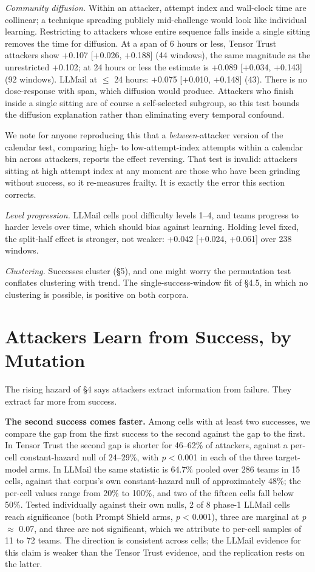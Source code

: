 \documentclass[conference]{IEEEtran}
\begin{document}
\textit{Community diffusion.} Within an attacker, attempt index and wall-clock time are collinear; a technique spreading publicly mid-challenge would look like individual learning. Restricting to attackers whose entire sequence falls inside a single sitting removes the time for diffusion. At a span of 6 hours or less, Tensor Trust attackers show +0.107 [+0.026, +0.188] (44 windows), the same magnitude as the unrestricted +0.102; at 24 hours or less the estimate is +0.089 [+0.034, +0.143] (92 windows). LLMail at $\le$ 24 hours: +0.075 [+0.010, +0.148] (43). There is no dose-response with span, which diffusion would produce. Attackers who finish inside a single sitting are of course a self-selected subgroup, so this test bounds the diffusion explanation rather than eliminating every temporal confound.

We note for anyone reproducing this that a \textit{between}-attacker version of the calendar test, comparing high- to low-attempt-index attempts within a calendar bin across attackers, reports the effect reversing. That test is invalid: attackers sitting at high attempt index at any moment are those who have been grinding without success, so it re-measures frailty. It is exactly the error this section corrects.

\textit{Level progression.} LLMail cells pool difficulty levels 1--4, and teams progress to harder levels over time, which should bias against learning. Holding level fixed, the split-half effect is stronger, not weaker: +0.042 [+0.024, +0.061] over 238 windows.

\textit{Clustering.} Successes cluster (\S5), and one might worry the permutation test conflates clustering with trend. The single-success-window fit of \S4.5, in which no clustering is possible, is positive on both corpora.


\section{Attackers Learn from Success, by Mutation}

The rising hazard of \S4 says attackers extract information from failure. They extract far more from success.

\textbf{The second success comes faster.} Among cells with at least two successes, we compare the gap from the first success to the second against the gap to the first. In Tensor Trust the second gap is shorter for 46--62\% of attackers, against a per-cell constant-hazard null of 24--29\%, with \textit{p} \textless{} 0.001 in each of the three target-model arms. In LLMail the same statistic is 64.7\% pooled over 286 teams in 15 cells, against that corpus's own constant-hazard null of approximately 48\%; the per-cell values range from 20\% to 100\%, and two of the fifteen cells fall below 50\%. Tested individually against their own nulls, 2 of 8 phase-1 LLMail cells reach significance (both Prompt Shield arms, \textit{p} \textless{} 0.001), three are marginal at \textit{p} $\approx$ 0.07, and three are not significant, which we attribute to per-cell samples of 11 to 72 teams. The direction is consistent across cells; the LLMail evidence for this claim is weaker than the Tensor Trust evidence, and the replication rests on the latter.
\end{document}
